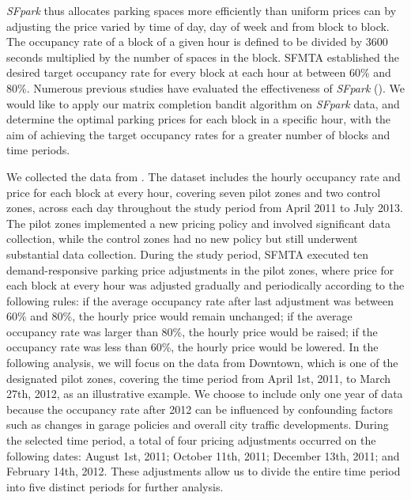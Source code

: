 \documentclass[12pt]{article}
\theoremstyle{plain}
\begin{document}
\emph{SFpark} thus allocates parking spaces more efficiently than uniform prices can by adjusting the price varied by time of day, day of week and from block to block. The occupancy rate of a block of a given hour is 
defined to be  divided by 3600 seconds multiplied by the number of spaces in the block. SFMTA established the desired target occupancy rate for every block at each hour at between 60\% and 80\%. Numerous previous studies have evaluated the effectiveness of \emph{SFpark} (\cite{pierce2013getting,millard2014curb}). We would like to apply our matrix completion bandit algorithm on \emph{SFpark} data, and determine the optimal parking prices for each block in a specific hour, with the aim of achieving the target occupancy rates for a greater number of blocks and time periods.  

We collected the data from \cite{sfpark_evaluation}. The dataset includes the hourly occupancy rate and price for each block at every hour, covering seven pilot zones and two control zones, across each day throughout the study period from April 2011 to July 2013. The pilot zones implemented a new pricing policy and involved significant data collection, while the control zones had no new policy but still underwent substantial data collection. During the study period, SFMTA executed ten demand-responsive parking price adjustments in the pilot zones, where price for each block at every hour was adjusted gradually and periodically according to the following rules: if the average occupancy rate after last adjustment was between 60\% and 80\%, the hourly price would remain unchanged; if the average occupancy rate was larger than 80\%, the hourly price would be raised; if the occupancy rate was less than 60\%, the hourly price would be lowered. In the following analysis, we will focus on the data from Downtown, which is one of the designated pilot zones, covering the time period from April 1st, 2011, to March 27th, 2012, as an illustrative example. We choose to include only one year of data because the occupancy rate after 2012 can be influenced by confounding factors such as changes in garage policies and overall city traffic developments. During the selected time period, a total of four pricing adjustments occurred on the following dates: August 1st, 2011; October 11th, 2011; December 13th, 2011; and February 14th, 2012. These adjustments allow us to divide the entire time period into five distinct periods for further analysis. 
\end{document}
